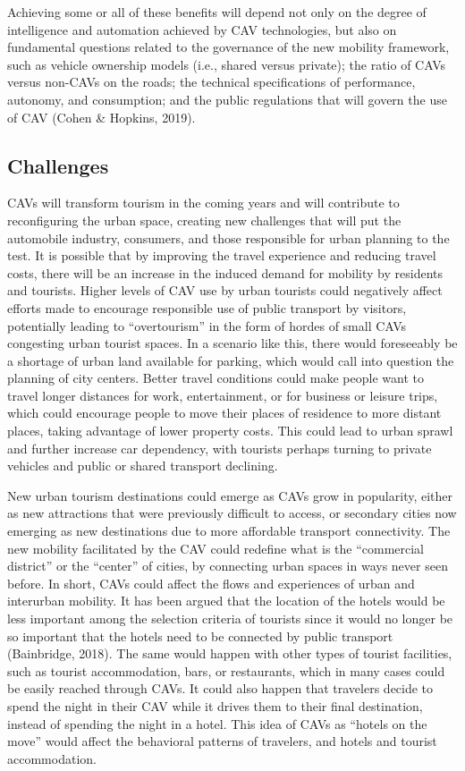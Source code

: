 \documentclass[
  letterpaper,
  DIV=11,
  numbers=noendperiod]{scrreprt}
\begin{document}
Achieving some or all of these benefits will depend not only on the
degree of intelligence and automation achieved by CAV technologies, but
also on fundamental questions related to the governance of the new
mobility framework, such as vehicle ownership models (i.e., shared
versus private); the ratio of CAVs versus non-CAVs on the roads; the
technical specifications of performance, autonomy, and consumption; and
the public regulations that will govern the use of CAV (Cohen \&
Hopkins, 2019).

\hypertarget{challenges-5}{%
\subsection{Challenges}\label{challenges-5}}

CAVs will transform tourism in the coming years and will contribute to
reconfiguring the urban space, creating new challenges that will put the
automobile industry, consumers, and those responsible for urban planning
to the test. It is possible that by improving the travel experience and
reducing travel costs, there will be an increase in the induced demand
for mobility by residents and tourists. Higher levels of CAV use by
urban tourists could negatively affect efforts made to encourage
responsible use of public transport by visitors, potentially leading to
``overtourism'' in the form of hordes of small CAVs congesting urban
tourist spaces. In a scenario like this, there would foreseeably be a
shortage of urban land available for parking, which would call into
question the planning of city centers. Better travel conditions could
make people want to travel longer distances for work, entertainment, or
for business or leisure trips, which could encourage people to move
their places of residence to more distant places, taking advantage of
lower property costs. This could lead to urban sprawl and further
increase car dependency, with tourists perhaps turning to private
vehicles and public or shared transport declining.

New urban tourism destinations could emerge as CAVs grow in popularity,
either as new attractions that were previously difficult to access, or
secondary cities now emerging as new destinations due to more affordable
transport connectivity. The new mobility facilitated by the CAV could
redefine what is the ``commercial district'' or the ``center'' of
cities, by connecting urban spaces in ways never seen before. In short,
CAVs could affect the flows and experiences of urban and interurban
mobility. It has been argued that the location of the hotels would be
less important among the selection criteria of tourists since it would
no longer be so important that the hotels need to be connected by public
transport (Bainbridge, 2018). The same would happen with other types of
tourist facilities, such as tourist accommodation, bars, or restaurants,
which in many cases could be easily reached through CAVs. It could also
happen that travelers decide to spend the night in their CAV while it
drives them to their final destination, instead of spending the night in
a hotel. This idea of CAVs as ``hotels on the move'' would affect the
behavioral patterns of travelers, and hotels and tourist accommodation.
\end{document}
